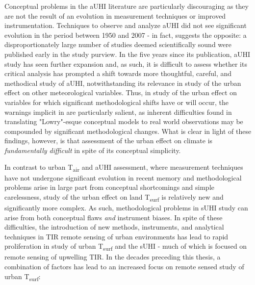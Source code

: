 \begin{bibunit}
Conceptual problems in the aUHI literature are particularly discouraging as they are not the result of an evolution in measurement techniques or improved instrumentation. Techniques to observe and analyze aUHI did not see significant evolution in the period between 1950 and 2007 - in fact, \citet{Stewart2011} suggests the opposite: a disproportionately large number of studies deemed scientifically sound were published early in the study purview. In the five years since its publication, aUHI study has seen further expansion and, as such, it is difficult to assess whether its critical analysis has prompted a shift towards more thoughtful, careful, and methodical study of aUHI, notwithstanding its relevance in study of the urban effect on other meteorological variables. Thus, in study of the urban effect on variables for which significant methodological shifts have or will occur, the warnings implicit in \citet{Stewart2011} are particularly salient, as inherent difficulties found in translating "Lowry"-esque conceptual models to real world observations may be compounded by significant methodological changes. What is clear in light of these findings, however, is that assessment of the urban effect on climate is \textit{fundamentally difficult} in spite of its conceptual simplicity. 


In contrast to urban T\textsubscript{air} and aUHI assessment, where measurement techniques have not undergone significant evolution in recent memory and methodological problems arise in large part from conceptual shortcomings and simple carelessness, study of the urban effect on land T\textsubscript{surf} is relatively new and significantly more complex. As such, methodological problems in sUHI study can arise from both conceptual flaws \textit{and} instrument biases. In spite of these difficulties, the introduction of new methods, instruments, and analytical techniques in TIR remote sensing of urban environments has lead to rapid proliferation in study of urban T\textsubscript{surf} and the sUHI - much of which is focused on remote sensing of upwelling TIR. In the decades preceding this thesis, a combination of factors has lead to an increased focus on remote sensed study of urban T\textsubscript{surf}: 


\end{bibunit}
